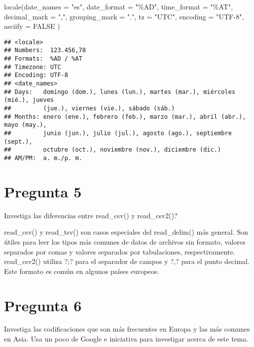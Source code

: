 \documentclass[
]{article}
\newenvironment{Shaded}{\begin{snugshade}}{\end{snugshade}}
\newcommand{\AttributeTok}[1]{\textcolor[rgb]{0.77,0.63,0.00}{#1}}
\newcommand{\ConstantTok}[1]{\textcolor[rgb]{0.00,0.00,0.00}{#1}}
\newcommand{\FunctionTok}[1]{\textcolor[rgb]{0.00,0.00,0.00}{#1}}
\newcommand{\NormalTok}[1]{#1}
\newcommand{\StringTok}[1]{\textcolor[rgb]{0.31,0.60,0.02}{#1}}
\begin{document}
\begin{Shaded}
\begin{Highlighting}[]
\FunctionTok{locale}\NormalTok{(}\AttributeTok{date\_names =} \StringTok{"es"}\NormalTok{,}
       \AttributeTok{date\_format =} \StringTok{"\%AD"}\NormalTok{,}
       \AttributeTok{time\_format =} \StringTok{"\%AT"}\NormalTok{,}
       \AttributeTok{decimal\_mark =} \StringTok{","}\NormalTok{,}
       \AttributeTok{grouping\_mark =} \StringTok{"."}\NormalTok{,}
       \AttributeTok{tz =} \StringTok{"UTC"}\NormalTok{,}
       \AttributeTok{encoding =} \StringTok{"UTF{-}8"}\NormalTok{,}
       \AttributeTok{asciify =} \ConstantTok{FALSE}
\NormalTok{)}
\end{Highlighting}
\end{Shaded}

\begin{verbatim}
## <locale>
## Numbers:  123.456,78
## Formats:  %AD / %AT
## Timezone: UTC
## Encoding: UTF-8
## <date_names>
## Days:   domingo (dom.), lunes (lun.), martes (mar.), miércoles (mié.), jueves
##         (jue.), viernes (vie.), sábado (sáb.)
## Months: enero (ene.), febrero (feb.), marzo (mar.), abril (abr.), mayo (may.),
##         junio (jun.), julio (jul.), agosto (ago.), septiembre (sept.),
##         octubre (oct.), noviembre (nov.), diciembre (dic.)
## AM/PM:  a. m./p. m.
\end{verbatim}

\hypertarget{pregunta-5}{%
\section{Pregunta 5}\label{pregunta-5}}

Investiga las diferencias entre read\_csv() y read\_csv2()?

read\_csv() y read\_tsv() son casos especiales del read\_delim() más
general. Son útiles para leer los tipos más comunes de datos de archivos
sin formato, valores separados por comas y valores separados por
tabulaciones, respectivamente. read\_csv2() utiliza ?;? para el
separador de campos y ?,? para el punto decimal. Este formato es común
en algunos países europeos.

\hypertarget{pregunta-6}{%
\section{Pregunta 6}\label{pregunta-6}}

Investiga las codificaciones que son más frecuentes en Europa y las más
comunes en Asia. Usa un poco de Google e iniciativa para investigar
acerca de este tema.
\end{document}

